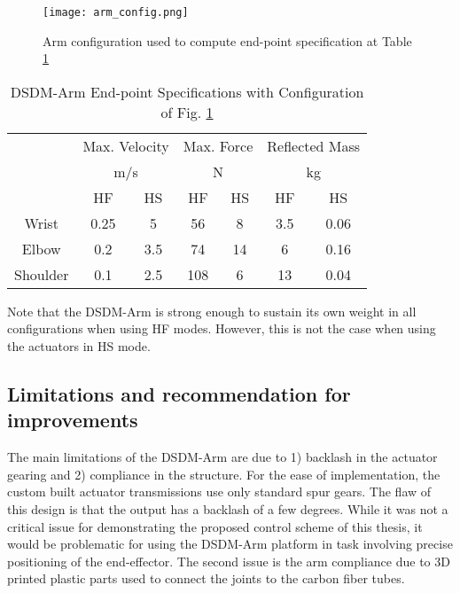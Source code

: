 \begin{figure}[htb]
	\centering
		\texttt{[image: arm\_config.png]}
	\caption{Arm configuration used to compute end-point specification at Table \ref{tab:robotspec2}}
	\label{fig:arm_config}
\end{figure}

\begin{table}[H]
	\centering
	\caption{DSDM-Arm End-point Specifications with Configuration of Fig. \ref{fig:arm_config}}
		\begin{tabular}{ c c c c c c c }
			\hline
			   & \multicolumn{2}{c}{Max. Velocity} & \multicolumn{2}{c}{Max. Force} & \multicolumn{2}{c}{Reflected Mass}\\
			   & \multicolumn{2}{c}{m/s} & \multicolumn{2}{c}{N} & \multicolumn{2}{c}{kg } \\
				\hline
			  & HF & HS & HF & HS & HF & HS \\
			\hline
			 Wrist    & 0.25 & 5    & 56  &  8  & 3.5 & 0.06   \\
			 Elbow    & 0.2  & 3.5  & 74  &  14 & 6   & 0.16    \\
			 Shoulder & 0.1  & 2.5  & 108 &  6  & 13  & 0.04    \\
			\hline
		\end{tabular}
	\label{tab:robotspec2}
\end{table}

Note that the DSDM-Arm is strong enough to sustain its own weight in all configurations when using HF modes. However, this is not the case when using the actuators in HS mode. 


\subsection{Limitations and recommendation for improvements} 

The main limitations of the DSDM-Arm are due to 1) backlash in the actuator gearing and 2) compliance in the structure. For the ease of implementation, the custom built actuator transmissions use only standard spur gears. The flaw of this design is that the output has a backlash of a few degrees. While it was not a critical issue for demonstrating the proposed control scheme of this thesis, it would be problematic for using the DSDM-Arm platform in task involving precise positioning of the end-effector. The second issue is the arm compliance due to 3D printed plastic parts used to connect the joints to the carbon fiber tubes. 

